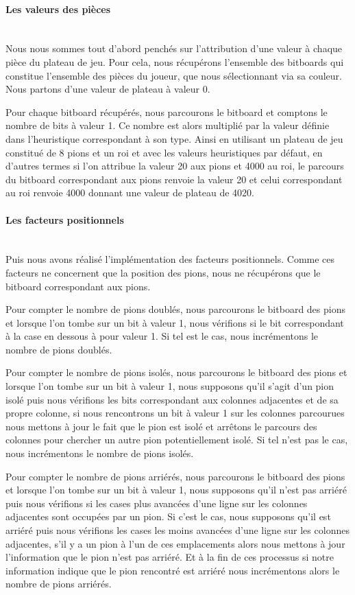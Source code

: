 \huge\documentclass{article}
\begin{document}
    \paragraph{Les valeurs des pièces}
    ~~\\
    Nous nous sommes tout d'abord penchés sur l'attribution d'une valeur à chaque pièce du plateau de jeu. Pour cela, nous récupérons l'ensemble des bitboards qui constitue l'ensemble des pièces du joueur, que nous sélectionnant via sa couleur. Nous partons d'une valeur de plateau à valeur 0.

    Pour chaque bitboard récupérés, nous parcourons le bitboard et comptons le nombre de bits à valeur 1. Ce nombre est alors multiplié par la valeur définie dans l'heuristique correspondant à son type. Ainsi en utilisant un plateau de jeu constitué de 8 pions et un roi et avec les valeurs heuristiques par défaut, en d'autres termes si l'on attribue la valeur 20 aux pions et 4000 au roi, le parcours du bitboard correspondant aux pions renvoie la valeur 20 et celui correspondant au roi renvoie 4000 donnant une valeur de plateau de 4020.
    \newline
    \paragraph{Les facteurs positionnels}
    ~~\\
    Puis nous avons réalisé l'implémentation des facteurs positionnels. Comme ces facteurs ne concernent que la position des pions, nous ne récupérons que le bitboard correspondant aux pions.

    Pour compter le nombre de pions doublés, nous parcourons le bitboard des pions et lorsque l'on tombe sur un bit à valeur 1, nous vérifions si le bit correspondant à la case en dessous à pour valeur 1.
    Si tel est le cas, nous incrémentons le nombre de pions doublés.

    Pour compter le nombre de pions isolés, nous parcourons le bitboard des pions et lorsque l'on tombe sur un bit à valeur 1, nous supposons qu'il s'agit d'un pion isolé puis nous vérifions les bits correspondant aux colonnes adjacentes et de sa propre colonne, si nous rencontrons un bit à valeur 1 sur les colonnes parcourues nous mettons à jour le fait que le pion est isolé et arrêtons le parcours des colonnes pour chercher un autre pion potentiellement isolé. Si tel n'est pas le cas, nous incrémentons le nombre de pions isolés.

    Pour compter le nombre de pions arriérés, nous parcourons le bitboard des pions et lorsque l'on tombe sur un bit à valeur 1, nous supposons qu'il n'est pas arriéré puis nous vérifions si les cases plus avancées d'une ligne sur les colonnes adjacentes sont occupées par un pion. Si c'est le cas, nous supposons qu'il est arriéré puis nous vérifions les cases les moins avancées d'une ligne sur les colonnes adjacentes, s'il y a un pion à l'un de ces emplacements alors nous mettons à jour l'information que le pion n'est pas arriéré. Et à la fin de ces processus si notre information indique que le pion rencontré est arriéré nous incrémentons alors le nombre de pions arriérés.
\end{document}
